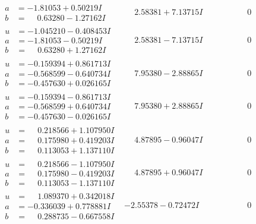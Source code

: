 \documentclass[1p]{elsarticle_modified}
\theoremstyle{definition}
\begin{document}
$$\begin{array}{c|c|c}
\begin{aligned}
a &= -1.81053 + 0.50219 I \\
b &= \phantom{-}0.63280 - 1.27162 I\end{aligned}
 & \phantom{-}2.58381 + 7.13715 I & \phantom{-0.000000 } 0 \\ \hline\begin{aligned}
u &= -1.045210 - 0.408453 I \\
a &= -1.81053 - 0.50219 I \\
b &= \phantom{-}0.63280 + 1.27162 I\end{aligned}
 & \phantom{-}2.58381 - 7.13715 I & \phantom{-0.000000 } 0 \\ \hline\begin{aligned}
u &= -0.159394 + 0.861713 I \\
a &= -0.568599 - 0.640734 I \\
b &= -0.457630 + 0.026165 I\end{aligned}
 & \phantom{-}7.95380 - 2.88865 I & \phantom{-0.000000 } 0 \\ \hline\begin{aligned}
u &= -0.159394 - 0.861713 I \\
a &= -0.568599 + 0.640734 I \\
b &= -0.457630 - 0.026165 I\end{aligned}
 & \phantom{-}7.95380 + 2.88865 I & \phantom{-0.000000 } 0 \\ \hline\begin{aligned}
u &= \phantom{-}0.218566 + 1.107950 I \\
a &= \phantom{-}0.175980 + 0.419203 I \\
b &= \phantom{-}0.113053 + 1.137110 I\end{aligned}
 & \phantom{-}4.87895 - 0.96047 I & \phantom{-0.000000 } 0 \\ \hline\begin{aligned}
u &= \phantom{-}0.218566 - 1.107950 I \\
a &= \phantom{-}0.175980 - 0.419203 I \\
b &= \phantom{-}0.113053 - 1.137110 I\end{aligned}
 & \phantom{-}4.87895 + 0.96047 I & \phantom{-0.000000 } 0 \\ \hline\begin{aligned}
u &= \phantom{-}1.089370 + 0.342018 I \\
a &= -0.336039 + 0.778881 I \\
b &= \phantom{-}0.288735 - 0.667558 I\end{aligned}
 & -2.55378 - 0.72472 I & \phantom{-0.000000 } 0\\

\end{array}$$
\end{document}
